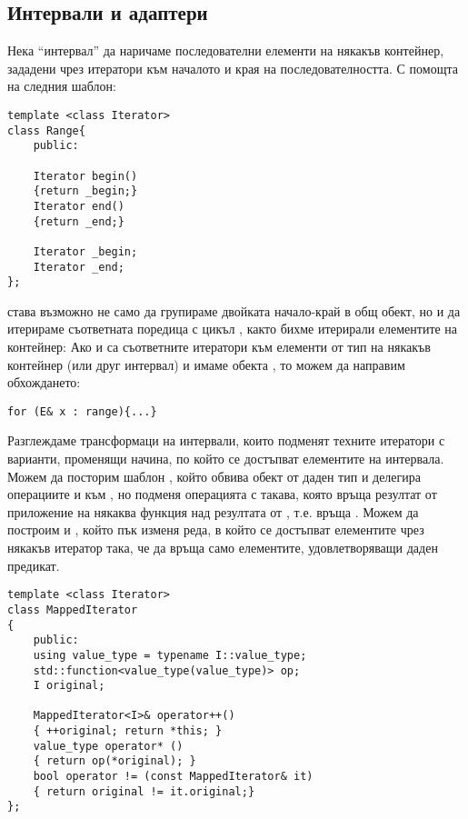 \subsection {Интервали и адаптери}

\begin{mdframed}[hidealllines=true,backgroundcolor=gray!20]
  Нека ``интервал'' да наричаме последователни елементи на някакъв контейнер, зададени чрез итератори към началото и края на последователността. С помощта на следния шаблон:
\begin{verbatim}
template <class Iterator>
class Range{
    public:
        
    Iterator begin()
    {return _begin;}
    Iterator end()
    {return _end;}
    
    Iterator _begin;
    Iterator _end;
};
\end{verbatim}

  става възможно не само да групираме двойката начало-край в общ обект, но и да итерираме съответната поредица с цикъл , както бихме итерирали елементите на контейнер: Ако  и  са съответните итератори към елементи от тип  на някакъв контейнер (или друг интервал) и имаме обекта , то можем да направим обхождането:
 \begin{verbatim}
for (E& x : range){...}   
 \end{verbatim}
 
 Разглеждаме трансформаци на интервали, които подменят техните итератори с варианти, променящи начина, по който се достъпват елементите на интервала. Можем да посторим шаблон , който обвива обект  от даден тип  и делегира операциите \code{++} и \code{!=} към , но подменя операцията \code{*} с такава, която връща резултат от приложение на някаква функция  над резултата от , т.е. връща . Можем да построим и , който пък изменя реда, в който се достъпват елементите чрез някакъв итератор така, че \code{*} да връща само елементите, удовлетворяващи даден предикат. 
  
\begin{verbatim}
template <class Iterator>
class MappedIterator
{
    public:
    using value_type = typename I::value_type;      
    std::function<value_type(value_type)> op;
    I original;

    MappedIterator<I>& operator++()
    { ++original; return *this; }
    value_type operator* ()
    { return op(*original); }  
    bool operator != (const MappedIterator& it)
    { return original != it.original;}
};
\end{verbatim}


\end{mdframed}

